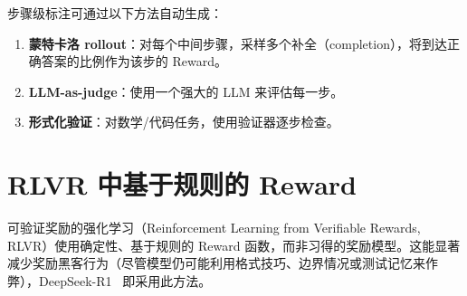 步骤级标注可通过以下方法自动生成：

\begin{enumerate}
  \item \textbf{蒙特卡洛 rollout}：对每个中间步骤，采样多个补全（completion），将到达正确答案的比例作为该步的 Reward。
  \item \textbf{LLM-as-judge}：使用一个强大的 LLM 来评估每一步。
  \item \textbf{形式化验证}：对数学/代码任务，使用验证器逐步检查。
\end{enumerate}

\section{RLVR 中基于规则的 Reward}
\label{sec:rule-based-rewards}

可验证奖励的强化学习（Reinforcement Learning from Verifiable Rewards, RLVR）使用确定性、基于规则的 Reward 函数，而非习得的奖励模型。这能显著减少奖励黑客行为（尽管模型仍可能利用格式技巧、边界情况或测试记忆来作弊），DeepSeek-R1~\cite{deepseek2025r1} 即采用此方法。

